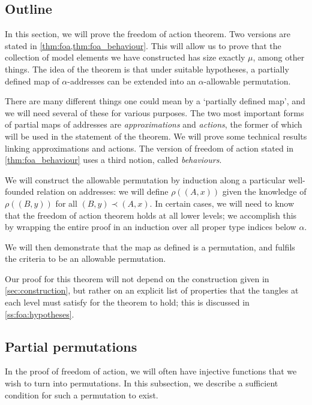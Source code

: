 \subsection{Outline}
\label{ss:foa:outline}

In this section, we will prove the freedom of action theorem.
Two versions are stated in \cref{thm:foa,thm:foa_behaviour}.
This will allow us to prove that the collection of model elements we have constructed has size exactly \( \mu \), among other things.
The idea of the theorem is that under suitable hypotheses, a partially defined map of \( \alpha \)-addresses can be extended into an \( \alpha \)-allowable permutation.

There are many different things one could mean by a `partially defined map', and we will need several of these for various purposes.
The two most important forms of partial maps of addresses are \emph{approximations} and \emph{actions}, the former of which will be used in the statement of the theorem.
We will prove some technical results linking approximations and actions.
The version of freedom of action stated in \cref{thm:foa_behaviour} uses a third notion, called \emph{behaviours}.

We will construct the allowable permutation by induction along a particular well-founded relation on addresses: we will define \( \rho((A, x)) \) given the knowledge of \( \rho((B, y)) \) for all \( (B, y) \prec (A, x) \).
In certain cases, we will need to know that the freedom of action theorem holds at all lower levels; we accomplish this by wrapping the entire proof in an induction over all proper type indices below \( \alpha \).

We will then demonstrate that the map as defined is a permutation, and fulfils the criteria to be an allowable permutation.

Our proof for this theorem will not depend on the construction given in \cref{sec:construction}, but rather on an explicit list of properties that the tangles at each level must satisfy for the theorem to hold; this is discussed in \cref{ss:foa:hypotheses}.

\subsection{Partial permutations}
\label{ss:foa:partial_perm}

In the proof of freedom of action, we will often have injective functions that we wish to turn into permutations.
In this subsection, we describe a sufficient condition for such a permutation to exist.

